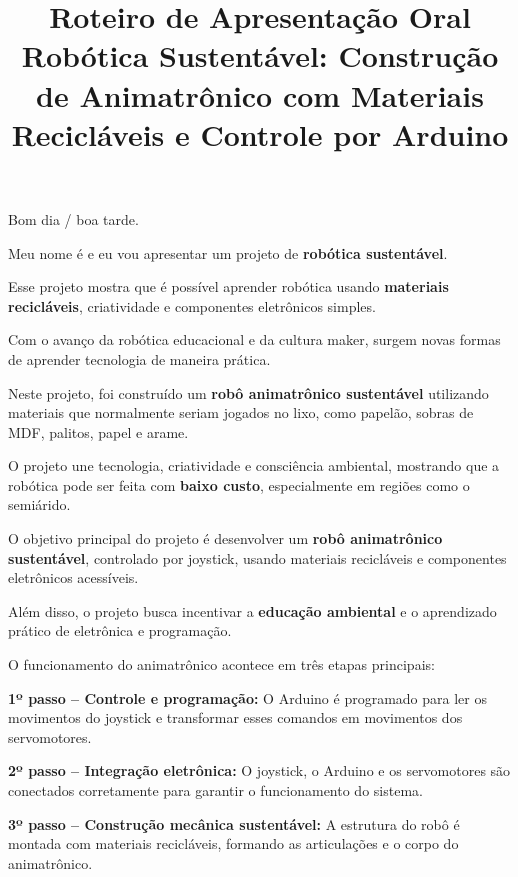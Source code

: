 \documentclass[12pt]{article}
\title{
\textcolor{roxo}{Roteiro de Apresentação Oral}\\
\textbf{\textcolor{azul}{Robótica Sustentável: Construção de Animatrônico com Materiais Recicláveis e Controle por Arduino}}
}
\author{}
\date{}
\begin{document}
\maketitle

\onehalfspacing

\begin{tcolorbox}[colback=blue!5,colframe=azul,title=\textbf{Abertura}]
Bom dia / boa tarde.

Meu nome é \underline{\hspace{5cm}} e eu vou apresentar um projeto de \textbf{robótica sustentável}.

Esse projeto mostra que é possível aprender robótica usando \textbf{materiais recicláveis}, criatividade e componentes eletrônicos simples.
\end{tcolorbox}

\begin{tcolorbox}[colback=green!5,colframe=verde,title=\textbf{Introdução}]
Com o avanço da robótica educacional e da cultura maker, surgem novas formas de aprender tecnologia de maneira prática.

Neste projeto, foi construído um \textbf{robô animatrônico sustentável} utilizando materiais que normalmente seriam jogados no lixo, como papelão, sobras de MDF, palitos, papel e arame.

O projeto une tecnologia, criatividade e consciência ambiental, mostrando que a robótica pode ser feita com \textbf{baixo custo}, especialmente em regiões como o semiárido.
\end{tcolorbox}

\begin{tcolorbox}[colback=orange!5,colframe=laranja,title=\textbf{Objetivo do Projeto}]
O objetivo principal do projeto é desenvolver um \textbf{robô animatrônico sustentável}, controlado por joystick, usando materiais recicláveis e componentes eletrônicos acessíveis.

Além disso, o projeto busca incentivar a \textbf{educação ambiental} e o aprendizado prático de eletrônica e programação.
\end{tcolorbox}

\begin{tcolorbox}[colback=purple!5,colframe=roxo,title=\textbf{Como o Projeto Funciona}]
O funcionamento do animatrônico acontece em três etapas principais:

\textbf{1º passo -- Controle e programação:} O Arduino é programado para ler os movimentos do joystick e transformar esses comandos em movimentos dos servomotores.

\textbf{2º passo -- Integração eletrônica:} O joystick, o Arduino e os servomotores são conectados corretamente para garantir o funcionamento do sistema.

\textbf{3º passo -- Construção mecânica sustentável:} A estrutura do robô é montada com materiais recicláveis, formando as articulações e o corpo do animatrônico.
\end{tcolorbox}
\end{document}
